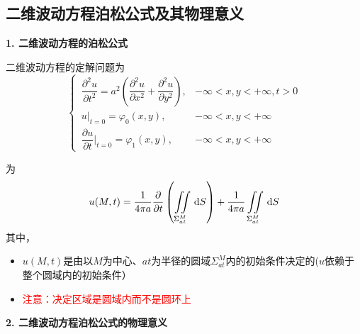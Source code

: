 \subsection{二维波动方程泊松公式及其物理意义}
\noindent \textbf{1. 二维波动方程的泊松公式}

二维波动方程的定解问题为
\begin{equation}
			\begin{cases}
			\, \dfrac{\partial^2 u}{\partial t^2} = a^2 \left(\dfrac{\partial^2 u}{\partial x^2} + \dfrac{\partial^2 u}{\partial y^2} \right), & -\infty < x,y<+\infty, t>0\\[0.7em]
			\, u\Big|_{t = 0} = \varphi_0 (x,y) , & -\infty < x,y<+\infty \\[0.7em]
			\, \dfrac{\partial u}{\partial t}\Bigg|_{t = 0} = \varphi_1(x,y), & -\infty < x,y<+\infty
	\end{cases}
\end{equation}

为
\begin{equation}
	u(M,t) = \dfrac{1}{4 \pi a} \dfrac{\partial }{\partial t} \left(\iint \limits_{\Sigma_{at}^M}\, {\rm{d}} S\right) + \dfrac{1}{4 \pi a} \iint \limits_{\Sigma_{at}^M}\, {\rm{d}} S
\end{equation}
其中，\vspace*{-0.5em}
\begin{itemize}
	\item $u(M,t)$是由以$M$为中心、$at$为半径的圆域$\Sigma_{at}^M$内的初始条件决定的($u$依赖于整个圆域内的初始条件）\vspace*{-0.5em}
	\item \textcolor{red}{注意：决定区域是圆域内而不是圆环上}
\end{itemize}

\noindent \textbf{2. 二维波动方程泊松公式的物理意义}
\vspace*{1em}

